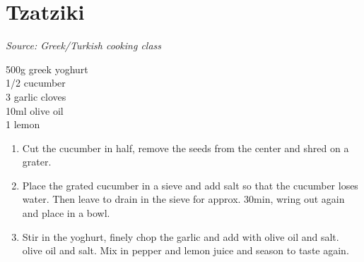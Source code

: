 \documentclass{report}
\begin{document}
\section{Tzatziki}
\textit{Source: Greek/Turkish cooking class}\\
\begin{minipage}[t]{0.21\textwidth} \vspace{0pt} 
500g greek yoghurt\\
1/2 cucumber\\
3 garlic cloves\\
10ml olive oil\\
1 lemon\\
\end{minipage}
\hfill
\begin{minipage}[t]{0.78\textwidth} \vspace{0pt}
	\begin{enumerate}
		\item Cut the cucumber in half, remove the seeds from the center and shred on a grater. 
		\item Place the grated cucumber in a sieve and add salt so that the cucumber loses water. Then leave to drain in the sieve for approx. 30min, wring out again and place in a bowl. 
		\item Stir in the yoghurt, finely chop the garlic and add with olive oil and salt. olive oil and salt. Mix in pepper and lemon juice and season to taste again.
	\end{enumerate}	
\end{minipage}
\end{document}
